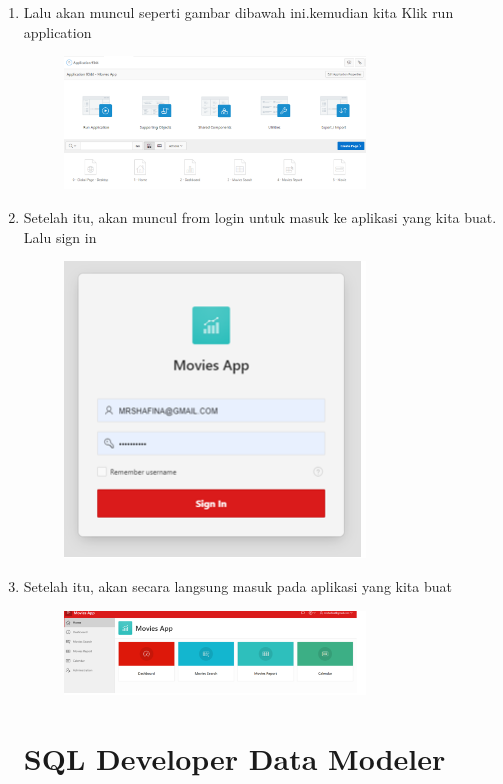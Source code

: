 \documentclass{article}
\begin{document}
\begin{enumerate}
\begin{figure}[h]
            \end{figure}
    \item Lalu akan muncul seperti gambar dibawah ini.kemudian kita Klik run application
    \begin{figure}[h]
            \centerline{\includegraphics[width=8cm]{image/16.png}}
            \end{figure}
    \item Setelah itu, akan muncul from login untuk masuk ke aplikasi yang kita buat. Lalu sign in 
    \begin{figure}[h]
            \centerline{\includegraphics[width=8cm]{image/17.PNG}}
            \end{figure}
   \newpage \item Setelah itu, akan secara langsung masuk pada aplikasi yang kita buat
   \begin{figure}[h]
            \centerline{\includegraphics[width=8cm]{image/18.PNG}}
            \end{figure}
\newpage \section{SQL Developer Data Modeler }

\end{enumerate}
\end{document}
